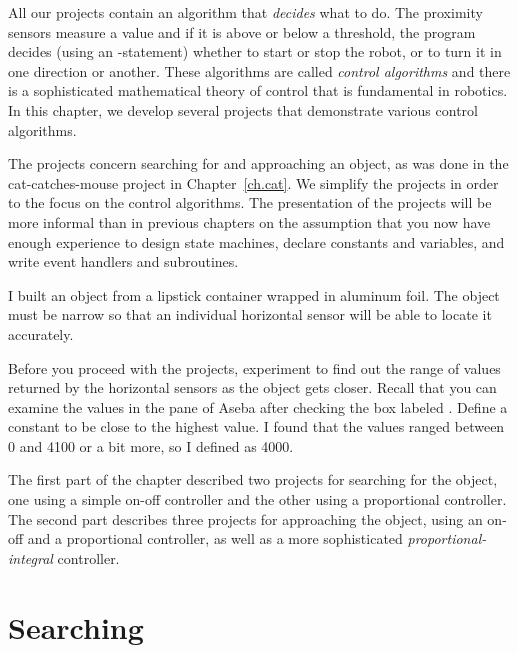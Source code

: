 \label{ch.control}

All our projects contain an algorithm that \emph{decides} what to do.
The proximity sensors measure a value and if it is above or below a
threshold, the program decides (using an -statement) whether to
start or stop the robot, or to turn it in one direction or another. These
algorithms are called \emph{control algorithms} and there is a
sophisticated mathematical theory of control that is fundamental in
robotics. In this chapter, we develop several projects that demonstrate
various control algorithms.

The projects concern searching for and approaching an object, as was
done in the cat-catches-mouse project in Chapter~\ref{ch.cat}. We
simplify the projects in order to the focus on the control algorithms.
The presentation of the projects will be more informal than in
previous chapters on the assumption that you now have enough experience
to design state machines, declare constants and variables, and write
event handlers and subroutines.

I built an object from a lipstick container wrapped in aluminum foil.
The object must be narrow so that an individual horizontal sensor
will be able to locate it accurately.


Before you proceed with the projects, experiment to find out the range
of values returned by the horizontal sensors as the object
gets closer. Recall that you can examine the values in the
 pane of Aseba after checking the box labeled .
Define a constant  to be close to the highest value. I
found that the values ranged between 0 and 4100 or a bit more, so I
defined  as 4000.

The first part of the chapter described two projects for searching for
the object, one using a simple on-off controller and the other using a
proportional controller. The second part describes three projects for
approaching the object, using an on-off and a proportional controller,
as well as a more sophisticated \emph{proportional-integral} controller.


\section{Searching}

